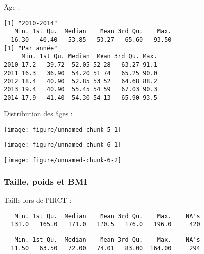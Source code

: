 \documentclass[11pt,a4paper]{article}\usepackage[]{graphicx}\usepackage[]{color}
\makeatletter
\def\maxwidth{ %
  \ifdim\Gin@nat@width>\linewidth
    \linewidth
  \else
    \Gin@nat@width
  \fi
}
\newenvironment{kframe}{%
 \def\at@end@of@kframe{}%
 \ifinner\ifhmode%
  \def\at@end@of@kframe{\end{minipage}}%
  \begin{minipage}{\columnwidth}%
 \fi\fi%
 \def\FrameCommand##1{\hskip\@totalleftmargin \hskip-\fboxsep
 \colorbox{shadecolor}{##1}\hskip-\fboxsep
     \hskip-\linewidth \hskip-\@totalleftmargin \hskip\columnwidth}%
 \MakeFramed {\advance\hsize-\width
   \@totalleftmargin\z@ \linewidth\hsize
   \@setminipage}}%
 {\par\unskip\endMakeFramed%
 \at@end@of@kframe}
\newenvironment{knitrout}{}{} %
\makeatother
\begin{document}
Âge :
\begin{knitrout}
\color{fgcolor}\begin{kframe}
\begin{verbatim}
[1] "2010-2014"
   Min. 1st Qu.  Median    Mean 3rd Qu.    Max. 
  16.30   40.40   53.85   53.27   65.60   93.50 
[1] "Par année"
     Min. 1st Qu. Median  Mean 3rd Qu. Max.
2010 17.2   39.72  52.05 52.28   63.27 91.1
2011 16.3   36.90  54.20 51.74   65.25 90.0
2012 18.4   40.90  52.85 53.52   64.68 88.2
2013 19.4   40.90  55.45 54.59   67.03 90.3
2014 17.9   41.40  54.30 54.13   65.90 93.5
\end{verbatim}
\end{kframe}
\end{knitrout}

Distribution des âges :

\begin{knitrout}
\color{fgcolor}
\texttt{[image: figure/unnamed-chunk-5-1]} 

\end{knitrout}


\begin{knitrout}
\color{fgcolor}
\texttt{[image: figure/unnamed-chunk-6-1]} 

\texttt{[image: figure/unnamed-chunk-6-2]} 

\end{knitrout}

    \subsubsection{Taille, poids et BMI}
  
Taille lors de l'IRCT :
  
\begin{knitrout}
\color{fgcolor}\begin{kframe}
\begin{verbatim}
   Min. 1st Qu.  Median    Mean 3rd Qu.    Max.    NA's 
  131.0   165.0   171.0   170.5   176.0   196.0     420 
\end{verbatim}
\end{kframe}
\end{knitrout}

\begin{knitrout}
\color{fgcolor}\begin{kframe}
\begin{verbatim}
   Min. 1st Qu.  Median    Mean 3rd Qu.    Max.    NA's 
  11.50   63.50   72.00   74.01   83.00  164.00     294 
\end{verbatim}
\end{kframe}
\end{knitrout}
\end{document}
